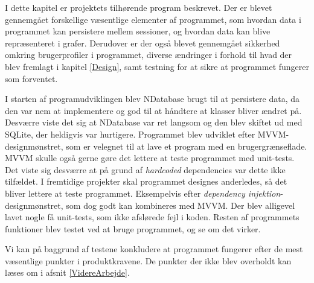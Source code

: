 I dette kapitel er projektets tilhørende program beskrevet. Der er blevet gennemgået forskellige væsentlige elementer af programmet, som hvordan data i programmet kan persistere mellem sessioner, og hvordan data kan blive repræsenteret i grafer. Derudover er der også blevet gennemgået sikkerhed omkring brugerprofiler i programmet, diverse ændringer i forhold til hvad der blev fremlagt i kapitel \ref{Design}, samt testning for at sikre at programmet fungerer som forventet.

I starten af programudviklingen blev NDatabase brugt til at persistere data, da den var nem at implementere og god til at håndtere at klasser bliver ændret på. Desværre viste det sig at NDatabase var ret langsom og den blev skiftet ud med SQLite, der heldigvis var hurtigere. Programmet blev udviklet efter MVVM-designmønstret, som er velegnet til at lave et program med en brugergrænseflade. MVVM skulle også gerne gøre det lettere at teste programmet med unit-tests.
Det viste sig desværre at på grund af \textit{hardcoded} dependencies var dette ikke tilfældet. I fremtidige projekter skal programmet designes anderledes, så det bliver lettere at teste programmet. Eksempelvis efter \textit{dependency injektion}-designmønstret, som dog godt kan kombineres med MVVM. Der blev alligevel lavet nogle få unit-tests, som ikke afslørede fejl i koden. Resten af programmets funktioner blev testet ved at bruge programmet, og se om det virker. 

Vi kan  på baggrund af testene konkludere at programmet fungerer efter de mest væsentlige punkter i produktkravene. De punkter der ikke blev overholdt kan læses om i afsnit \ref{VidereArbejde}.


